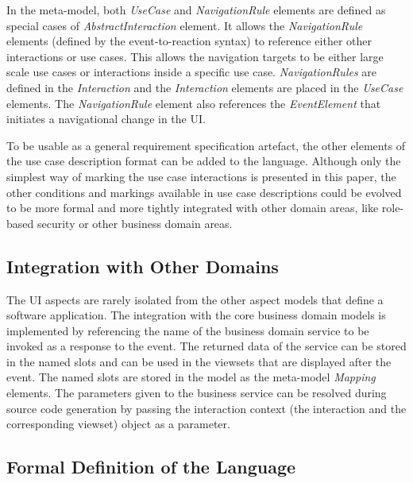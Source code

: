 \documentclass[conference]{IEEEtran}
\begin{document}
In the meta-model, both \textit{UseCase} and \textit{NavigationRule} elements
are defined as special cases of \textit{AbstractInteraction} element. It allows
the \textit{NavigationRule} elements (defined by the event-to-reaction syntax)
to reference either other interactions or use cases. This allows the navigation
targets to be either large scale use cases or interactions inside a specific
use case.  \textit{NavigationRules} are defined in the \textit{Interaction} and
the \textit{Interaction} elements are placed in the \textit{UseCase} elements.
The \textit{NavigationRule} element also references the \textit{EventElement}
that initiates a navigational change in the UI.

To be usable as a general requirement specification artefact, the other
elements of the use case description format can be added to the language.
Although only the simplest way of marking the use case interactions is
presented in this paper, the other conditions and markings available in use
case descriptions could be evolved to be more formal and more tightly
integrated with other domain areas, like role-based security or other business
domain areas.

\subsection{Integration with Other Domains}

The UI aspects are rarely isolated from the other aspect models that define a
software application. The integration with the core business domain models is
implemented by referencing the name of the business domain service to be
invoked as a response to the event. The returned data of the service can be
stored in the named slots and can be used in the viewsets that are displayed
after the event. The named slots are stored in the model as the meta-model
\textit{Mapping} elements. The parameters given to the business service can be
resolved during source code generation by passing the interaction context (the
interaction and the corresponding viewset) object as a parameter.

\subsection{Formal Definition of the Language}
\end{document}
